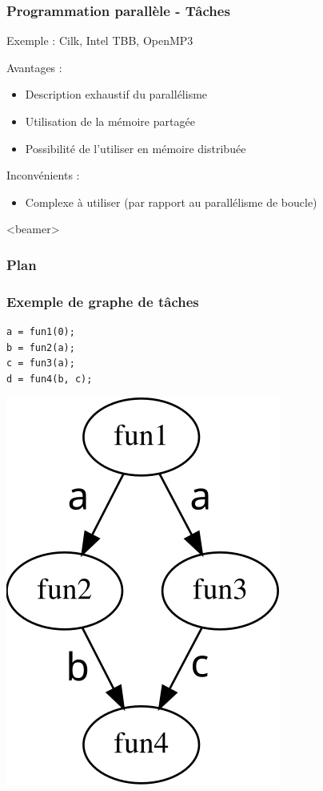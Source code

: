 \documentclass{beamer}
\begin{document}
\begin{frame}
  \frametitle{Programmation parallèle - Tâches}
  Exemple : Cilk, Intel TBB, OpenMP3
  \bigskip

  Avantages :
  \begin{itemize}
    \item Description exhaustif du parallélisme
    \item Utilisation de la mémoire partagée
    \item Possibilité de l'utiliser en mémoire distribuée
  \end{itemize}

  Inconvénients :
  \begin{itemize}
    \item Complexe à utiliser (par rapport au parallélisme de boucle)
  \end{itemize}
\end{frame}

  \begin{frame}<beamer>
    \frametitle{Plan}
    \tableofcontents
  \end{frame}

\begin{frame}[fragile]
  \frametitle{Exemple de graphe de tâches}


\begin{lstlisting}
a = fun1(0);
b = fun2(a);
c = fun3(a);
d = fun4(b, c);
\end{lstlisting}

  \centerline{\includegraphics[width=0.25\linewidth]{agg_exemple}}
\end{frame}
\end{document}
